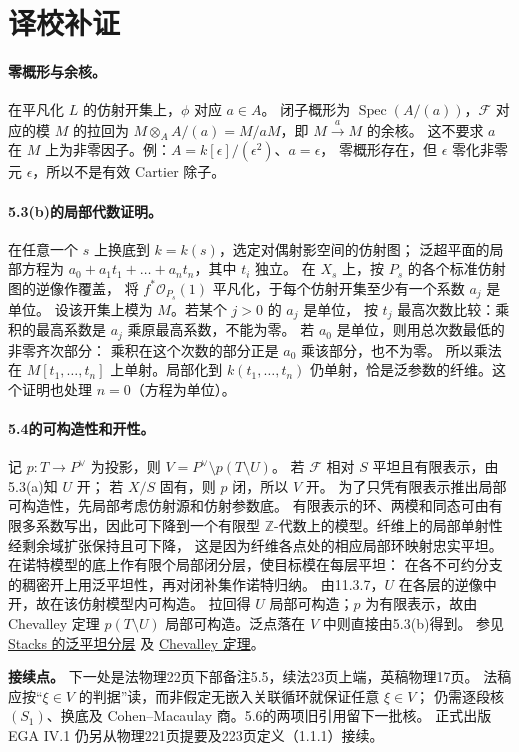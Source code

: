 \documentclass[openany,fontset=fandol]{ctexbook}
\DeclareMathOperator{\Spec}{Spec}
\newcommand{\OO}{\mathcal O}
\newcommand{\FF}{\mathcal F}
\begin{document}
\section*{译校补证}
\paragraph{零概形与余核。}
在平凡化 $L$ 的仿射开集上，$\phi$ 对应 $a\in A$。
闭子概形为 $\Spec(A/(a))$，$\FF$ 对应的模 $M$ 的拉回为
$M\otimes_A A/(a)=M/aM$，即 $M\xrightarrow{a} M$ 的余核。
这不要求 $a$ 在 $M$ 上为非零因子。例：$A=k[\epsilon]/(\epsilon^2)$、$a=\epsilon$，
零概形存在，但 $\epsilon$ 零化非零元 $\epsilon$，所以不是有效 Cartier 除子。

\paragraph{5.3(b)的局部代数证明。}
在任意一个 $s$ 上换底到 $k=k(s)$，选定对偶射影空间的仿射图；
泛超平面的局部方程为
$a_0+a_1t_1+\dots+a_nt_n$，其中 $t_i$ 独立。
在 $X_s$ 上，按 $P_s$ 的各个标准仿射图的逆像作覆盖，
将 $f^*\OO_{P_s}(1)$ 平凡化，于每个仿射开集至少有一个系数 $a_j$ 是单位。
设该开集上模为 $M$。若某个 $j>0$ 的 $a_j$ 是单位，
按 $t_j$ 最高次数比较：乘积的最高系数是 $a_j$ 乘原最高系数，不能为零。
若 $a_0$ 是单位，则用总次数最低的非零齐次部分：
乘积在这个次数的部分正是 $a_0$ 乘该部分，也不为零。
所以乘法在 $M[t_1,\ldots,t_n]$ 上单射。局部化到 $k(t_1,\ldots,t_n)$
仍单射，恰是泛参数的纤维。这个证明也处理 $n=0$（方程为单位）。

\paragraph{5.4的可构造性和开性。}
记 $p:T\to P^\vee$ 为投影，则 $V=P^\vee\setminus p(T\setminus U)$。
若 $\FF$ 相对 $S$ 平坦且有限表示，由5.3(a)知 $U$ 开；
若 $X/S$ 固有，则 $p$ 闭，所以 $V$ 开。
为了只凭有限表示推出局部可构造性，先局部考虑仿射源和仿射参数底。
有限表示的环、两模和同态可由有限多系数写出，因此可下降到一个有限型
$\mathbb Z$-代数上的模型。纤维上的局部单射性经剩余域扩张保持且可下降，
这是因为纤维各点处的相应局部环映射忠实平坦。
在诺特模型的底上作有限个局部闭分层，使目标模在每层平坦：
在各不可约分支的稠密开上用泛平坦性，再对闭补集作诺特归纳。
由11.3.7，$U$ 在各层的逆像中开，故在该仿射模型内可构造。
拉回得 $U$ 局部可构造；$p$ 为有限表示，故由 Chevalley 定理
$p(T\setminus U)$ 局部可构造。泛点落在 $V$ 中则直接由5.3(b)得到。
参见 \href{https://stacks.math.columbia.edu/tag/0H3Y}{Stacks 的泛平坦分层}
及 \href{https://stacks.math.columbia.edu/tag/054K}{Chevalley 定理}。

\medskip
\noindent\textbf{接续点。}
下一处是法物理22页下部备注5.5，续法23页上端，英稿物理17页。
法稿应按“$\xi\in V$ 的判据”读，而非假定无嵌入关联循环就保证任意 $\xi\in V$；
仍需逐段核 $(S_1)$、换底及 Cohen--Macaulay 商。5.6的两项旧引用留下一批核。
正式出版 EGA IV.1 仍另从物理221页提要及223页定义（1.1.1）接续。
\end{document}
